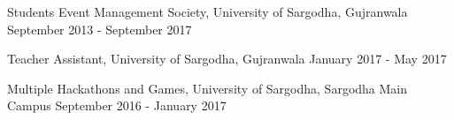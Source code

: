 

Students Event Management Society, University of Sargodha, Gujranwala	\hfill September 2013 - September 2017
 
Teacher Assistant, University of Sargodha, Gujranwala	\hfill January 2017 - May 2017

Multiple Hackathons and Games, University of Sargodha, Sargodha Main Campus	\hfill September 2016 - January 2017


